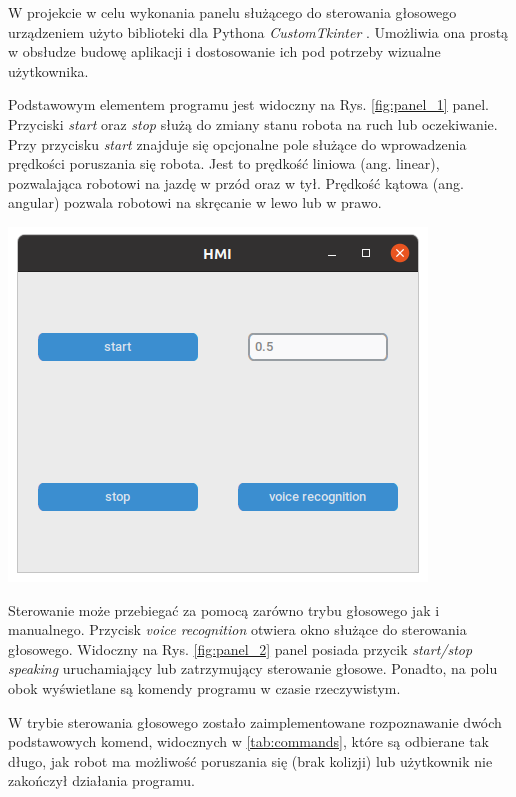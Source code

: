 W projekcie w celu wykonania panelu służącego do sterowania głosowego urządzeniem użyto biblioteki dla Pythona \textit{CustomTkinter} \cite{ctk}. Umożliwia ona prostą w obsłudze budowę aplikacji i dostosowanie ich pod potrzeby wizualne użytkownika.

Podstawowym elementem programu jest widoczny na Rys. \ref{fig:panel_1} panel. Przyciski \textit{start} oraz \textit{stop} służą do zmiany stanu robota na ruch lub oczekiwanie. Przy przycisku \textit{start} znajduje się opcjonalne pole służące do wprowadzenia prędkości poruszania się robota. Jest to prędkość liniowa (ang. linear), pozwalająca robotowi na jazdę w przód oraz w tył. Prędkość kątowa (ang. angular) pozwala robotowi na skręcanie w lewo lub w prawo. 
\begin{center}
    \includegraphics[width=0.8\linewidth]{files/panel_1.png}
    \label{fig:panel_1}
\end{center}

Sterowanie może przebiegać za pomocą zarówno trybu głosowego jak i manualnego. Przycisk \textit{voice recognition} otwiera okno służące do sterowania głosowego. Widoczny na Rys. \ref{fig:panel_2} panel posiada przycik \textit{start/stop speaking} uruchamiający lub zatrzymujący sterowanie głosowe. Ponadto, na polu obok wyświetlane są komendy programu w czasie rzeczywistym. 

W trybie sterowania głosowego zostało zaimplementowane rozpoznawanie dwóch podstawowych komend, widocznych w \ref{tab:commands}, które są odbierane tak długo, jak robot ma możliwość poruszania się (brak kolizji) lub użytkownik nie zakończył działania programu.

